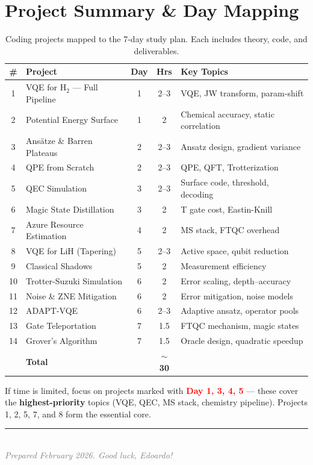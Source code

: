 \documentclass[11pt,a4paper]{article}
\begin{document}
\section*{Project Summary \& Day Mapping}

\begin{table}[H]
\centering
\small
\begin{tabular}{clccp{5.5cm}}
\toprule
\textbf{\#} & \textbf{Project} & \textbf{Day} & \textbf{Hrs} & \textbf{Key Topics} \\
\midrule
1 & VQE for H$_2$ --- Full Pipeline & 1 & 2--3 & VQE, JW transform, param-shift \\
2 & Potential Energy Surface & 1 & 2 & Chemical accuracy, static correlation \\
3 & Ansätze \& Barren Plateaus & 2 & 2--3 & Ansatz design, gradient variance \\
4 & QPE from Scratch & 2 & 2--3 & QPE, QFT, Trotterization \\
5 & QEC Simulation & 3 & 2--3 & Surface code, threshold, decoding \\
6 & Magic State Distillation & 3 & 2 & T gate cost, Eastin-Knill \\
7 & Azure Resource Estimation & 4 & 2 & MS stack, FTQC overhead \\
8 & VQE for LiH (Tapering) & 5 & 2--3 & Active space, qubit reduction \\
9 & Classical Shadows & 5 & 2 & Measurement efficiency \\
10 & Trotter-Suzuki Simulation & 6 & 2 & Error scaling, depth--accuracy \\
11 & Noise \& ZNE Mitigation & 6 & 2 & Error mitigation, noise models \\
12 & ADAPT-VQE & 6 & 2--3 & Adaptive ansatz, operator pools \\
13 & Gate Teleportation & 7 & 1.5 & FTQC mechanism, magic states \\
14 & Grover's Algorithm & 7 & 1.5 & Oracle design, quadratic speedup \\
\midrule
& \textbf{Total} & & \textbf{$\sim$30} & \\
\bottomrule
\end{tabular}
\caption{Coding projects mapped to the 7-day study plan. Each includes theory, code, and deliverables.}
\end{table}

\begin{importantbox}[Prioritization]
If time is limited, focus on projects marked with \textcolor{red}{\textbf{Day 1, 3, 4, 5}} --- these cover the \textbf{highest-priority} topics (VQE, QEC, MS stack, chemistry pipeline). Projects 1, 2, 5, 7, and 8 form the essential core.
\end{importantbox}


\vfill
\begin{center}
\textcolor{gray}{\rule{0.5\textwidth}{0.5pt}}\\[0.5em]
\textcolor{gray}{\textit{Prepared February 2026. Good luck, Edoardo!}}
\end{center}
\end{document}
